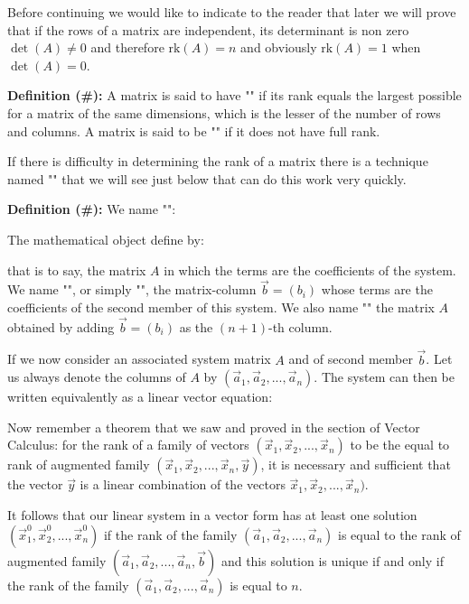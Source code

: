 	Before continuing we would like to indicate to the reader that later we will prove that if the rows of a matrix are independent, its determinant is non zero $\det(A)\neq 0$ and therefore $\text{rk}(A)=n$ and obviously $\text{rk}(A)=1$ when $\det(A)=0$.
	
	\textbf{Definition (\#\mydef):} A matrix is said to have "" if its rank equals the largest possible for a matrix of the same dimensions, which is the lesser of the number of rows and columns. A matrix is said to be "" if it does not have full rank.
	
	\begin{tcolorbox}[title=Remark,colframe=black,arc=10pt]
	If there is difficulty in determining the rank of a matrix there is a technique named "" that we will see just below that can do this work very quickly.
	\end{tcolorbox}
	\textbf{Definition (\#\mydef):} We name "":
	
	The mathematical object define by:
	
	that is to say, the matrix $A$ in which the terms are the coefficients of the system. We name "", or simply "", the matrix-column $\vec{b}=(b_i)$ whose terms are the coefficients of the second member of this system. We also name "" the matrix $A$ obtained by adding $\vec{b}=(b_i)$ as the $(n + 1)$-th column.
	
	If we now consider an associated  system matrix $A$ and of second member $\vec{b}$. Let us always denote the columns of $A$ by $(\vec{a}_1,\vec{a}_2,...,\vec{a}_n)$. The system can then be written equivalently as a linear vector equation:
	
	Now remember a theorem that we saw and proved in the section of Vector Calculus: for the rank of a family of vectors $(\vec{x}_1,\vec{x}_2,...,\vec{x}_n)$ to be the equal to rank of augmented family $(\vec{x}_1,\vec{x}_2,...,\vec{x}_n,\vec{y})$, it is necessary and sufficient that the vector $\vec{y}$ is a linear combination of the vectors $\vec{x}_1,\vec{x}_2,...,\vec{x}_n)$.
	
	It follows that our linear system in a vector form has at least one solution $(\vec{x}_1^0,\vec{x}_2^0,...,\vec{x}_n^0)$ if the rank of the family $(\vec{a}_1,\vec{a}_2,...,\vec{a}_n)$ is equal to the rank of augmented family $(\vec{a}_1,\vec{a}_2,...,\vec{a}_n,\vec{b})$ and this solution is unique if and only if the rank of the family $(\vec{a}_1,\vec{a}_2,...,\vec{a}_n)$ is equal to $n$.
	

